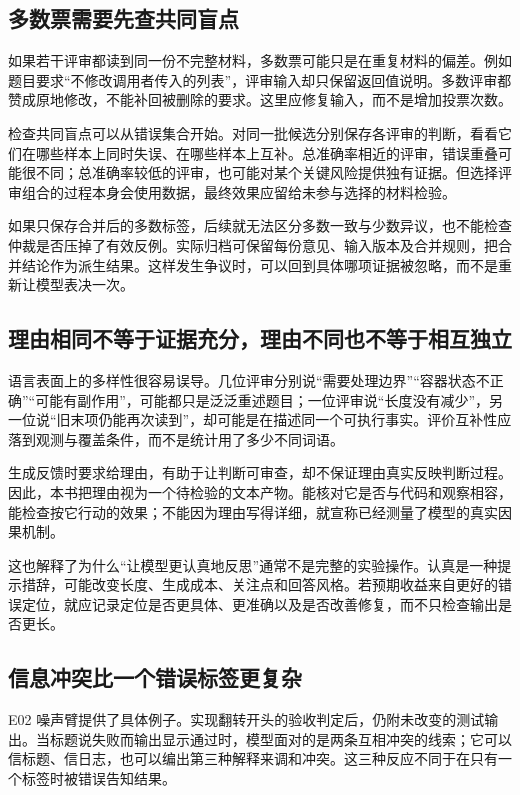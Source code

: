 \subsection{多数票需要先查共同盲点}

如果若干评审都读到同一份不完整材料，多数票可能只是在重复材料的偏差。例如题目要求“不修改调用者传入的列表”，评审输入却只保留返回值说明。多数评审都赞成原地修改，不能补回被删除的要求。这里应修复输入，而不是增加投票次数。

检查共同盲点可以从错误集合开始。对同一批候选分别保存各评审的判断，看看它们在哪些样本上同时失误、在哪些样本上互补。总准确率相近的评审，错误重叠可能很不同；总准确率较低的评审，也可能对某个关键风险提供独有证据。但选择评审组合的过程本身会使用数据，最终效果应留给未参与选择的材料检验。

如果只保存合并后的多数标签，后续就无法区分多数一致与少数异议，也不能检查仲裁是否压掉了有效反例。实际归档可保留每份意见、输入版本及合并规则，把合并结论作为派生结果。这样发生争议时，可以回到具体哪项证据被忽略，而不是重新让模型表决一次。

\subsection{理由相同不等于证据充分，理由不同也不等于相互独立}

语言表面上的多样性很容易误导。几位评审分别说“需要处理边界”“容器状态不正确”“可能有副作用”，可能都只是泛泛重述题目；一位评审说“长度没有减少”，另一位说“旧末项仍能再次读到”，却可能是在描述同一个可执行事实。评价互补性应落到观测与覆盖条件，而不是统计用了多少不同词语。

生成反馈时要求给理由，有助于让判断可审查，却不保证理由真实反映判断过程。因此，本书把理由视为一个待检验的文本产物。能核对它是否与代码和观察相容，能检查按它行动的效果；不能因为理由写得详细，就宣称已经测量了模型的真实因果机制。

这也解释了为什么“让模型更认真地反思”通常不是完整的实验操作。认真是一种提示措辞，可能改变长度、生成成本、关注点和回答风格。若预期收益来自更好的错误定位，就应记录定位是否更具体、更准确以及是否改善修复，而不只检查输出是否更长。

\subsection{信息冲突比一个错误标签更复杂}

E02 噪声臂提供了具体例子。实现翻转开头的验收判定后，仍附未改变的测试输出。当标题说失败而输出显示通过时，模型面对的是两条互相冲突的线索；它可以信标题、信日志，也可以编出第三种解释来调和冲突。这三种反应不同于在只有一个标签时被错误告知结果。

